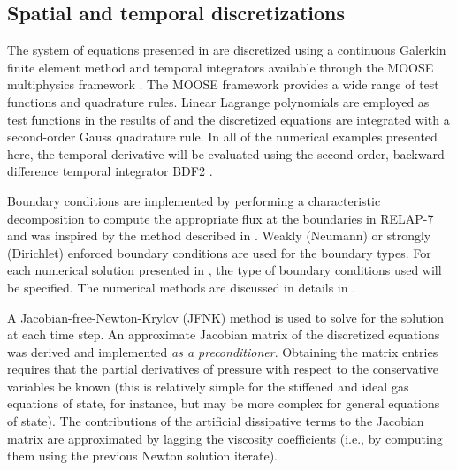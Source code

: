 \documentclass{inputs/mc2015}
\begin{document}
\subsection{Spatial and temporal discretizations} \label{sec:spatial-disc}
%
The system of equations presented in  are discretized using a continuous Galerkin finite element 
method and temporal integrators available through the MOOSE multiphysics framework \cite{MOOSE}.
The MOOSE framework 
provides a wide range of test functions and quadrature rules. Linear Lagrange polynomials are employed 
as test functions in the results of  and the discretized equations are integrated with a second-order Gauss quadrature rule.
In all of the numerical examples presented here, the temporal derivative  will be 
evaluated using the second-order, backward difference temporal integrator BDF2 \cite{bdf2}.

Boundary conditions are implemented by performing a characteristic decomposition to compute the 
appropriate flux at the boundaries in RELAP-7 and was inspired by the method described in \cite{SEM}. 
Weakly (Neumann) or strongly (Dirichlet) enforced boundary conditions are used for the boundary types.
For each numerical solution presented in , the type of boundary conditions used 
will be specified. 
The numerical methods are discussed in details in \cite{Berry_Peterson_2014}.

A Jacobian-free-Newton-Krylov (JFNK) method is used to solve for the solution at each time step. 
An approximate Jacobian matrix of the discretized equations was derived and implemented \emph{as a preconditioner}. Obtaining the 
matrix entries requires that the partial derivatives of pressure with respect to the conservative variables 
be known (this is relatively simple for the stiffened and ideal gas equations of state, for instance, but may be more 
complex for general equations of state). The contributions of the artificial dissipative terms to the 
Jacobian matrix are approximated by lagging the viscosity coefficients (i.e., by computing them using the previous Newton solution iterate). 
%
\end{document}
